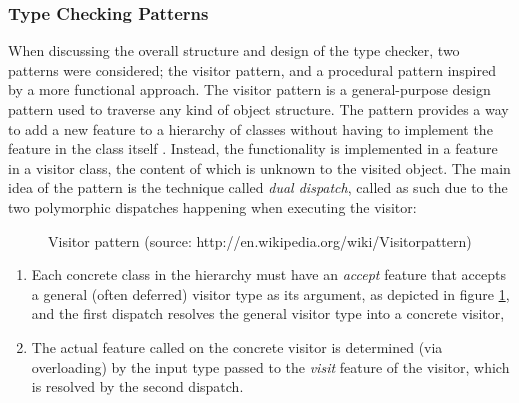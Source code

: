 \subsubsection{Type Checking Patterns}
\label{design-tc-patterns}
When discussing the overall structure and design of the type checker, two patterns were considered; the visitor pattern, and a procedural pattern inspired by a more functional approach.
The visitor pattern is a general-purpose design pattern used to traverse any kind of object structure. The pattern provides a way to add a new feature to a hierarchy of classes without having to implement the feature in the class itself \cite{martin2002}. Instead, the functionality is implemented in a feature in a visitor class, the content of which is unknown to the visited object. The main idea of the pattern is the technique called \textit{dual dispatch}, called as such due to the two polymorphic dispatches happening when executing the visitor: 
\begin{figure}[H]
\centerline{}
    \caption[The visitor pattern]{Visitor pattern (source: http://en.wikipedia.org/wiki/Visitor\textunderscore pattern)}
    \label{fig:visitor-pattern}
\end{figure}
\begin{enumerate}
\item Each concrete class in the hierarchy must have an \textit{accept} feature that accepts a general (often deferred) visitor type as its argument, as depicted in figure \ref{fig:visitor-pattern}, and the first dispatch resolves the general visitor type into a concrete visitor,
\item The actual feature called on the concrete visitor is determined (via overloading) by the input type passed to the \textit{visit} feature of the visitor, which is resolved by the second dispatch.  
\end{enumerate}
